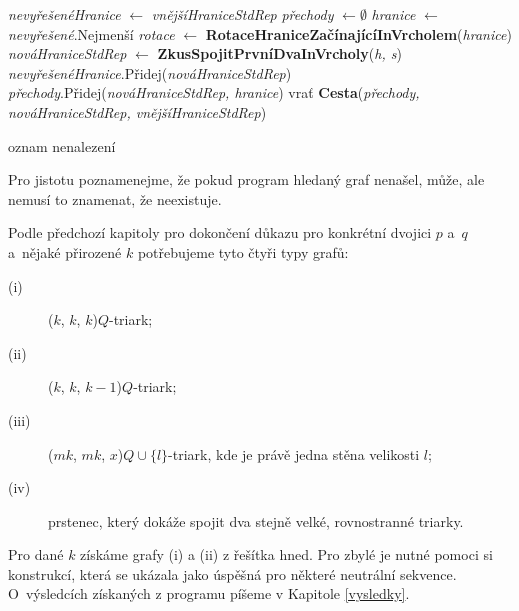 \begin{algorithm}
\label{alg:Vypln}
\begin{algorithmic}

\State \textit{nevyřešenéHranice} $\gets$ \textit{vnějšíHraniceStdRep}	
\State \textit{přechody} $\gets \emptyset$ 		
 \State \textit{hranice} $\gets$ \textit{nevyřešené}.Nejmenší
\State \textit{rotace} $\gets$ \textbf{RotaceHraniceZačínajícíInVrcholem}(\textit{hranice})
\State	\textit{nováHraniceStdRep} $\gets$ \textbf{ZkusSpojitPrvníDvaInVrcholy}(\textit{h, s}) 	
\State		\textit{nevyřešenéHranice}.Přidej(\textit{nováHraniceStdRep})
\State		\textit{přechody}.Přidej(\textit{nováHraniceStdRep, hranice})
\EndIf
\State		vrať \textbf{Cesta}(\textit{přechody, nováHraniceStdRep, vnějšíHraniceStdRep})
\EndIf

\EndFor
\EndFor
\EndWhile
\State oznam nenalezení
\EndProcedure

\end{algorithmic}
\end{algorithm}


Pro jistotu poznamenejme, že pokud program hledaný graf nenašel, může, ale nemusí to znamenat, že neexistuje.


\bigskip

Podle předchozí kapitoly pro dokončení důkazu pro konkrétní dvojici $p$ a~$q$ a~nějaké přirozené $k$ potřebujeme tyto čtyři typy grafů:
\begin{description}
\item[(i)] ($k$, $k$, $k$)$Q$-triark;
\item[(ii)] ($k$, $k$, $k-1$)$Q$-triark;
\item[(iii)] ($mk$, $mk$, $x$)$Q\cup \lbrace l\rbrace$-triark, kde je právě jedna stěna velikosti $l$;
\item[(iv)] prstenec, který dokáže spojit dva stejně velké, rovnostranné triarky.
\end{description}

Pro dané $k$ získáme grafy (i) a (ii) z řešítka hned. Pro zbylé je nutné pomoci si konstrukcí, která se ukázala jako úspěšná pro některé neutrální sekvence. O~výsledcích získaných z programu píšeme v Kapitole \ref{vysledky}.

